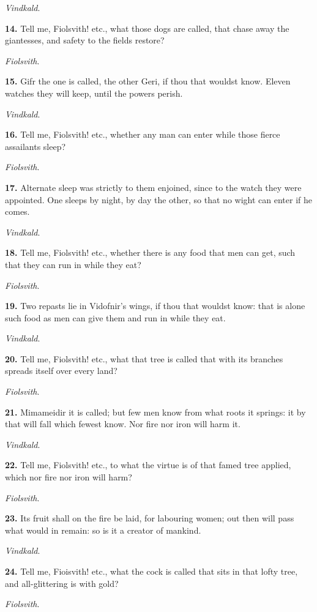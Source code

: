 \emph{Vindkald}.

\textbf{14.} Tell me, Fiolsvith! etc., what those dogs are called, that chase
away the giantesses, and safety to the fields restore?

\emph{Fiolsvith}.

\textbf{15.} Gifr the one is called, the other Geri, if thou that wouldst
know. Eleven watches they will keep, until the powers perish.

\emph{Vindkald}.

\textbf{16.} Tell me, Fiolsvith! etc., whether any man can enter while those
fierce assailants sleep?

\emph{Fiolsvith}.

\textbf{17.} Alternate sleep was strictly to them enjoined, since to the
watch they were appointed. One sleeps by night, by day the other, so
that no wight can enter if he comes.

\emph{Vindkald}.

\textbf{18.} Tell me, Fiolsvith! etc., whether there is any food that men can
get, such that they can run in while they eat?

\emph{Fiolsvith}.

\textbf{19.} Two repasts lie in Vidofnir's wings, if thou that wouldst know:
that is alone such food as men can give them and run in while they
eat.

\emph{Vindkald}.

\textbf{20.} Tell me, Fiolsvith! etc., what that tree is called that with its
branches spreads itself over every land?

\emph{Fiolsvith}.

\textbf{21.} Mimameidir it is called; but few men know from what roots it
springs: it by that will fall which fewest know. Nor fire nor iron
will harm it.

\emph{Vindkald}.

\textbf{22.} Tell me, Fiolsvith! etc., to what the virtue is of that famed
tree applied, which nor fire nor iron will harm?

\emph{Fiolsvith}.

\textbf{23.} Its fruit shall on the fire be laid, for labouring women; out
then will pass what would in remain: so is it a creator of mankind.

\emph{Vindkald}.

\textbf{24.} Tell me, Fioisvith! etc., what the cock is called that sits in
that lofty tree, and all-glittering is with gold?

\emph{Fiolsvith}.

